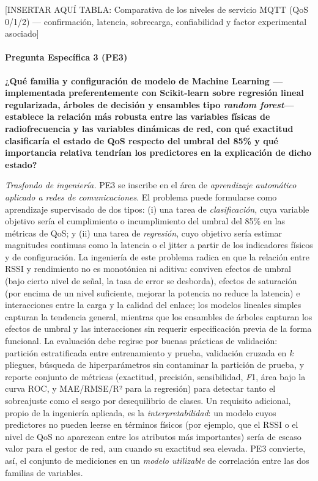 \documentclass[
  12pt,
]{article}
\begin{document}
{[}INSERTAR AQUÍ TABLA: Comparativa de los niveles de servicio MQTT (QoS
0/1/2) — confirmación, latencia, sobrecarga, confiabilidad y factor
experimental asociado{]}

\paragraph{Pregunta Específica 3
(PE3)}\label{pregunta-especuxedfica-3-pe3}

\textbf{¿Qué familia y configuración de modelo de Machine Learning
—implementada preferentemente con Scikit-learn sobre regresión lineal
regularizada, árboles de decisión y ensambles tipo \emph{random forest}—
establece la relación más robusta entre las variables físicas de
radiofrecuencia y las variables dinámicas de red, con qué exactitud
clasificaría el estado de QoS respecto del umbral del 85\% y qué
importancia relativa tendrían los predictores en la explicación de dicho
estado?}

\emph{Trasfondo de ingeniería.} PE3 se inscribe en el área de
\emph{aprendizaje automático aplicado a redes de comunicaciones}. El
problema puede formularse como aprendizaje supervisado de dos tipos: (i)
una tarea de \emph{clasificación}, cuya variable objetivo sería el
cumplimiento o incumplimiento del umbral del 85\% en las métricas de
QoS; y (ii) una tarea de \emph{regresión}, cuyo objetivo sería estimar
magnitudes continuas como la latencia o el jitter a partir de los
indicadores físicos y de configuración. La ingeniería de este problema
radica en que la relación entre RSSI y rendimiento no es monotónica ni
aditiva: conviven efectos de umbral (bajo cierto nivel de señal, la tasa
de error se desborda), efectos de saturación (por encima de un nivel
suficiente, mejorar la potencia no reduce la latencia) e interacciones
entre la carga y la calidad del enlace; los modelos lineales simples
capturan la tendencia general, mientras que los ensambles de árboles
capturan los efectos de umbral y las interacciones sin requerir
especificación previa de la forma funcional. La evaluación debe regirse
por buenas prácticas de validación: partición estratificada entre
entrenamiento y prueba, validación cruzada en \emph{k} pliegues,
búsqueda de hiperparámetros sin contaminar la partición de prueba, y
reporte conjunto de métricas (exactitud, precisión, sensibilidad,
\emph{F}1, área bajo la curva ROC, y MAE/RMSE/R² para la regresión) para
detectar tanto el sobreajuste como el sesgo por desequilibrio de clases.
Un requisito adicional, propio de la ingeniería aplicada, es la
\emph{interpretabilidad}: un modelo cuyos predictores no pueden leerse
en términos físicos (por ejemplo, que el RSSI o el nivel de QoS no
aparezcan entre los atributos más importantes) sería de escaso valor
para el gestor de red, aun cuando su exactitud sea elevada. PE3
convierte, así, el conjunto de mediciones en un \emph{modelo utilizable}
de correlación entre las dos familias de variables.
\end{document}
